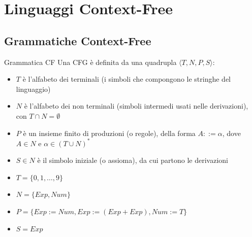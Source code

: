 \documentclass[12pt, a4paper]{report}
\begin{document}
        \section{Linguaggi Context-Free}
        \subsection{Grammatiche Context-Free}
            \begin{definitionbox}{Grammatica CF}{}
                Una CFG è definita da una quadrupla $\langle T, N, P, S \rangle$:
                \begin{itemize}
                    \item $T$ è l'alfabeto dei terminali (i simboli che compongono le stringhe del linguaggio)
                    \item $N$ è l'alfabeto dei non terminali (simboli intermedi usati nelle derivazioni), con $T \cap N = \emptyset$
                    \item $P$ è un insieme finito di produzioni (o regole), della forma $A ::= \alpha$, dove $A \in N$ e $\alpha \in (T \cup N)^*$
                    \item $S \in N$ è il simbolo iniziale (o assioma), da cui partono le derivazioni
                \end{itemize}
            \end{definitionbox}
            \begin{example}
                \begin{itemize}
                    \item $T=\{0,1,\ldots,9\}$
                    \item $N=\{Exp,Num\}$
                    \item $P=\{Exp:=Num, Exp:=(Exp+Exp), Num:=T\}$
                    \item $S=Exp$
                \end{itemize}
            \end{example}
\end{document}
